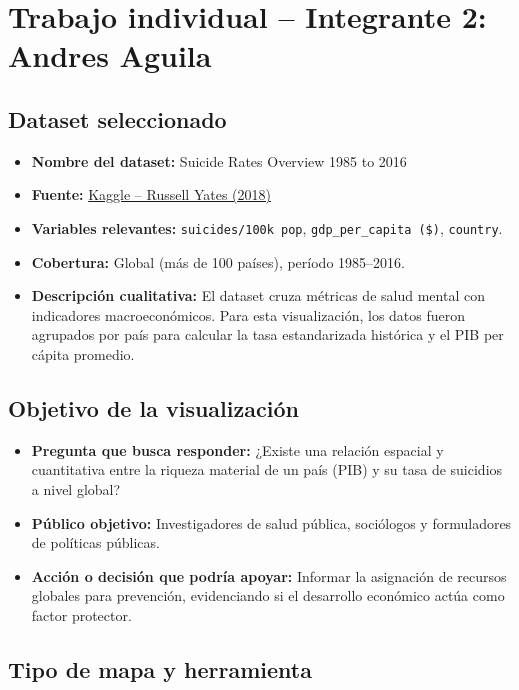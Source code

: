 \documentclass[12pt, letterpaper]{article}
\begin{document}
\section{Trabajo individual -- Integrante 2: Andres Aguila}

\subsection{Dataset seleccionado}

\begin{itemize}
  \item \textbf{Nombre del dataset:} Suicide Rates Overview 1985 to 2016
  \item \textbf{Fuente:} \href{https://www.kaggle.com/datasets/russellyates88/suicide-rates-overview-1985-to-2016}{Kaggle -- Russell Yates (2018)}
  \item \textbf{Variables relevantes:} \texttt{suicides/100k pop}, \texttt{gdp\_per\_capita (\$)}, \texttt{country}.
  \item \textbf{Cobertura:} Global (más de 100 países), período 1985--2016.
  \item \textbf{Descripción cualitativa:} El dataset cruza métricas de salud mental con indicadores macroeconómicos. Para esta visualización, los datos fueron agrupados por país para calcular la tasa estandarizada histórica y el PIB per cápita promedio.
\end{itemize}

\subsection{Objetivo de la visualización}

\begin{itemize}
  \item \textbf{Pregunta que busca responder:} ¿Existe una relación espacial y cuantitativa entre la riqueza material de un país (PIB) y su tasa de suicidios a nivel global?
  \item \textbf{Público objetivo:} Investigadores de salud pública, sociólogos y formuladores de políticas públicas.
  \item \textbf{Acción o decisión que podría apoyar:} Informar la asignación de recursos globales para prevención, evidenciando si el desarrollo económico actúa como factor protector.
\end{itemize} 

\subsection{Tipo de mapa y herramienta}
\end{document}
